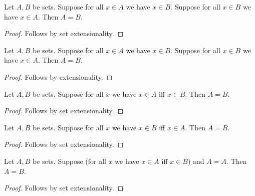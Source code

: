 \begin{proposition}\label{exact_set_extensionality}
    Let $A,B$ be sets.
    Suppose for all $x\in A$ we have $x\in B$.
    Suppose for all $x\in B$ we have $x\in A$.
    Then $A=B$.
\end{proposition}
\begin{proof}
    Follows by set extensionality.
\end{proof}

\begin{proposition}\label{generic_set_extensionality}
    Let $A,B$ be sets.
    Suppose for all $x\in A$ we have $x\in B$.
    Suppose for all $x\in B$ we have $x\in A$.
    Then $A=B$.
\end{proposition}
\begin{proof}
    Follows by extensionality.
\end{proof}

\begin{proposition}\label{pointwise_iff_set_extensionality}
    Let $A,B$ be sets.
    Suppose for all $x$ we have $x\in A$ iff $x\in B$.
    Then $A=B$.
\end{proposition}
\begin{proof}
    Follows by set extensionality.
\end{proof}

\begin{proposition}\label{reversed_pointwise_iff_set_extensionality}
    Let $A,B$ be sets.
    Suppose for all $x$ we have $x\in B$ iff $x\in A$.
    Then $A=B$.
\end{proposition}
\begin{proof}
    Follows by set extensionality.
\end{proof}

\begin{proposition}\label{conjoined_pointwise_iff_set_extensionality}
    Let $A,B$ be sets.
    Suppose (for all $x$ we have $x\in A$ iff $x\in B$) and $A=A$.
    Then $A=B$.
\end{proposition}
\begin{proof}
    Follows by set extensionality.
\end{proof}
